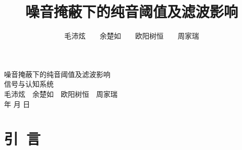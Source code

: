 \documentclass[jou,12pt,floatsintext]{apa7} %
\title{\heiti  噪音掩蔽下的纯音阈值及滤波影响} %
\author{\fangsong 毛沛炫\ \ \ \ 余楚如\ \ \  \ 欧阳树恒\ \ \ \ 周家瑞}
\affiliation{(浙江大学心理与行为科学系\ \ 310058)}
\begin{document}
\begin{titlepage}
    \centering
    \vspace*{4cm} %
    \Huge
    {\heiti  噪音掩蔽下的纯音阈值及滤波影响} \\
    \vspace{0.75cm}
    \large
    信号与认知系统 \\
    \vspace{2.cm}
    \large
    毛沛炫\ \ 余楚如\ \  欧阳树恒\ \ 周家瑞\\
    \vfill
    \large
    \number\year 年 \number\month 月 \number\day 日 \\
\end{titlepage}

\maketitle %




\section{引\ 言}
\end{document}

